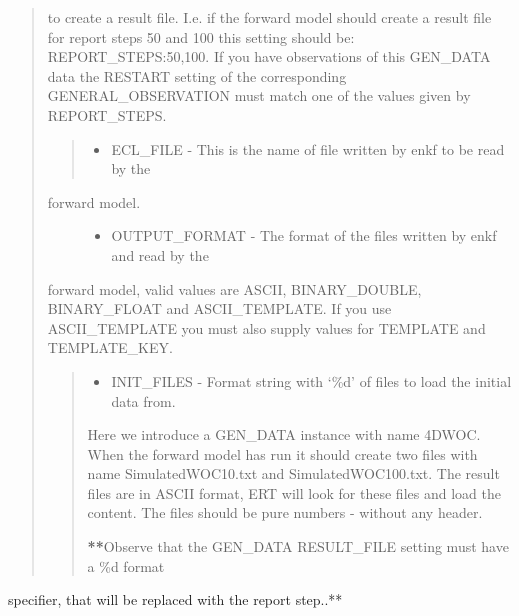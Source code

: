 \documentclass[a4paper,10pt,english]{sphinxmanual}
\begin{document}
\begin{sphinxShadowBox}
\begin{quote}
\begin{itemize}
\end{itemize}

to create a result file. I.e. if the forward model should create a result
file for report steps 50 and 100 this setting should be:
REPORT\_STEPS:50,100. If you have observations of this GEN\_DATA data the
RESTART setting of the corresponding GENERAL\_OBSERVATION must match one of
the values given by REPORT\_STEPS.
\begin{quote}

\begin{itemize}
\item {} 
ECL\_FILE - This is the name of file written by enkf to be read by the

\end{itemize}
\end{quote}
\begin{description}
\item[{forward model.}] \leavevmode\begin{itemize}
\item {} 
OUTPUT\_FORMAT - The format of the files written by enkf and read by the

\end{itemize}

\end{description}

forward model, valid values are ASCII, BINARY\_DOUBLE, BINARY\_FLOAT and
ASCII\_TEMPLATE. If you use ASCII\_TEMPLATE you must also supply values for
TEMPLATE and TEMPLATE\_KEY.
\begin{quote}
\begin{itemize}
\item {} 
INIT\_FILES - Format string with ‘\%d’ of files to load the initial data from.

\end{itemize}


%
\begin{sphinxVerbatim}[commandchars=\\\{\}]
         
\end{sphinxVerbatim}

Here we introduce a GEN\_DATA instance with name 4DWOC. When the forward model
has run it should create two files with name SimulatedWOC10.txt and
SimulatedWOC100.txt. The result files are in ASCII format, ERT will look for
these files and load the content. The files should be pure numbers - without
any header.

{\color{red}\bfseries{}**}Observe that the GEN\_DATA RESULT\_FILE setting must have a \%d format
\end{quote}
\end{quote}

specifier, that will be replaced with the report step..**
\end{sphinxShadowBox}
\end{document}
